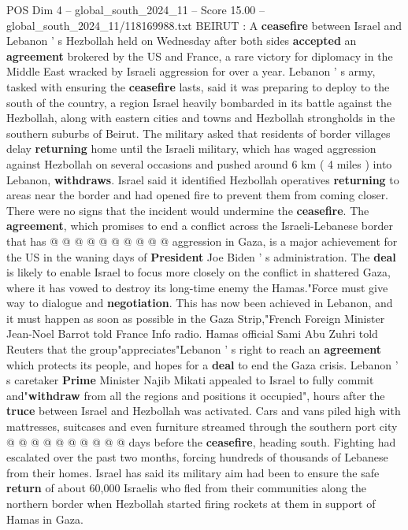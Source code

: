 \begin{textsample}{POS Dim 4 – global\_south\_2024\_11 – Score 15.00 – global\_south\_2024\_11/118169988.txt}  \label{ex:f4_pos_288}
BEIRUT : A \textbf{ceasefire} between Israel and Lebanon ' s Hezbollah held on Wednesday after both sides \textbf{accepted} an \textbf{agreement} brokered by the US and France, a rare victory for diplomacy in the Middle East wracked by Israeli aggression for over a year.
Lebanon ' s army, tasked with ensuring the \textbf{ceasefire} lasts, said it was preparing to deploy to the south of the country, a region Israel heavily bombarded in its battle against the Hezbollah, along with eastern cities and towns and Hezbollah strongholds in the southern suburbs of Beirut.
The military asked that residents of border villages delay \textbf{returning} home until the Israeli military, which has waged aggression against Hezbollah on several occasions and pushed around 6 km ( 4 miles ) into Lebanon, \textbf{withdraws}.
Israel said it identified Hezbollah operatives \textbf{returning} to areas near the border and had opened fire to prevent them from coming closer.
There were no signs that the incident would undermine the \textbf{ceasefire}.
The \textbf{agreement}, which promises to end a conflict across the Israeli-Lebanese border that has @ @ @ @ @ @ @ @ @ @ aggression in Gaza, is a major achievement for the US in the waning days of \textbf{President} Joe Biden ' s administration.
The \textbf{deal} is likely to enable Israel to focus more closely on the conflict in shattered Gaza, where it has vowed to destroy its long-time enemy the Hamas."Force must give way to dialogue and \textbf{negotiation}.
This has now been achieved in Lebanon, and it must happen as soon as possible in the Gaza Strip,"French Foreign Minister Jean-Noel Barrot told France Info radio.
Hamas official Sami Abu Zuhri told Reuters that the group"appreciates"Lebanon ' s right to reach an \textbf{agreement} which protects its people, and hopes for a \textbf{deal} to end the Gaza crisis.
Lebanon ' s caretaker \textbf{Prime} Minister Najib Mikati appealed to Israel to fully commit and"\textbf{withdraw} from all the regions and positions it occupied", hours after the \textbf{truce} between Israel and Hezbollah was activated.
Cars and vans piled high with mattresses, suitcases and even furniture streamed through the southern port city @ @ @ @ @ @ @ @ @ @ days before the \textbf{ceasefire}, heading south.
Fighting had escalated over the past two months, forcing hundreds of thousands of Lebanese from their homes.
Israel has said its military aim had been to ensure the safe \textbf{return} of about 60,000 Israelis who fled from their communities along the northern border when Hezbollah started firing rockets at them in support of Hamas in Gaza.

\end{textsample}

